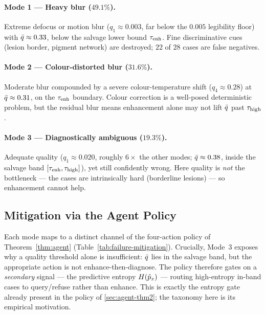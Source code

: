 \paragraph{Mode 1 --- Heavy blur ($49.1\%$).}
Extreme defocus or motion blur ($q_1\approx 0.003$, far below the $0.005$ legibility floor) with
$\bar{q}\approx 0.33$, below the salvage lower bound $\tau_{\mathrm{enh}}$. Fine discriminative cues (lesion border,
pigment network) are destroyed; $22$ of $28$ cases are false negatives.

\paragraph{Mode 2 --- Colour-distorted blur ($31.6\%$).}
Moderate blur compounded by a severe colour-temperature shift ($q_4\approx 0.28$) at
$\bar{q}\approx 0.31$, on the $\tau_{\mathrm{enh}}$ boundary. Colour correction is a well-posed deterministic
problem, but the residual blur means enhancement alone may not lift $\bar{q}$ past $\tau_{\mathrm{high}}$.

\paragraph{Mode 3 --- Diagnostically ambiguous ($19.3\%$).}
Adequate quality ($q_1\approx 0.020$, roughly $6\times$ the other modes; $\bar{q}\approx 0.38$, inside
the salvage band $[\tau_{\mathrm{enh}},\tau_{\mathrm{high}}]$), yet still confidently wrong. Here quality is \emph{not} the
bottleneck --- the cases are intrinsically hard (borderline lesions) --- so enhancement cannot help.

\subsection{Mitigation via the Agent Policy}\label{app:a18-mitigation}
Each mode maps to a distinct channel of the four-action policy of Theorem~\ref{thm:agent}
(Table~\ref{tab:failure-mitigation}). Crucially, Mode~3 exposes why a quality threshold alone is
insufficient: $\bar{q}$ lies in the salvage band, but the appropriate action is not
enhance-then-diagnose. The policy therefore gates on a \emph{secondary} signal --- the predictive
entropy $H(\hat{p}_x)$ --- routing high-entropy in-band cases to query/refuse rather than enhance.
This is exactly the entropy gate already present in the policy of \cref{sec:agent-thm2}; the taxonomy here
is its empirical motivation.

